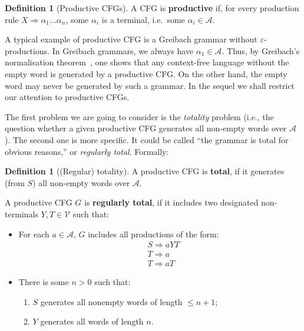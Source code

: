 \documentclass[a4paper,10pt]{amsart}
\theoremstyle{definition}
\newtheorem{definition}[theorem]{Definition}
\newcommand{\Alphabet}{\mathcal{A}}
\newcommand{\Var}{\mathcal{V}}
\begin{document}
\begin{definition}
[Productive CFGs]
A CFG is \textbf{productive} if, for every production rule $X \Rightarrow \alpha_1 \ldots \alpha_n$, some $\alpha_i$ is a terminal, i.e.\ some $\alpha_i \in \Alphabet$.
\end{definition}

A typical example of productive CFG is a Greibach grammar without $\varepsilon$-pro\-duc\-ti\-ons. In Greibach grammars, we always have $\alpha_1 \in \Alphabet$. Thus, by Greibach's normalisation theorem~\cite{Greibach1965}, one shows that any context-free language without the empty word is generated by a productive CFG. On the other hand, the empty word may never be generated by such a grammar.
In the sequel we shall restrict our attention to productive CFGs.

The first problem we are going to consider is the {\em totality} problem (i.e., the question whether a given productive CFG generates all non-empty words over $\Alphabet$). The second one is more specific. It could be called ``the grammar is total for obvious reasons,'' or {\em regularly total}. 
Formally:


\begin{definition}
[(Regular) totality]
\label{def-regtotal}
A productive CFG is \textbf{total}, if it generates (from $S$) all non-empty words over $\Alphabet$.


A productive CFG $G$ is \textbf{regularly total}, if it includes two designated non-terminals $Y,T \in \Var$ such that:
\begin{itemize}
    \item For each $a \in \Alphabet$, $G$ includes all productions of the form:
    \begin{align*}
& S \Rightarrow a Y T \\
& T \Rightarrow a \\
& T \Rightarrow a T 
\end{align*}
\item There is some $n>0$ such that:
\begin{enumerate}
    \item $S$ generates all nonempty words of length $\leq n+1$;
    \item $Y$ generates all words of length $n$.
\end{enumerate}
\end{itemize}

\end{definition}
\end{document}
